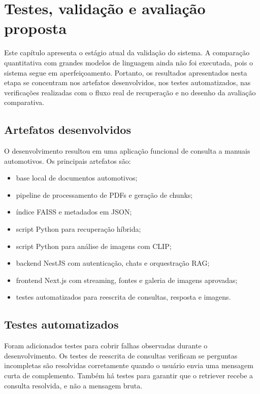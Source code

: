 \chapter{Testes, validação e avaliação proposta}
\label{cap:resultados}

Este capítulo apresenta o estágio atual da validação do sistema. A comparação quantitativa com grandes modelos de linguagem ainda não foi executada, pois o sistema segue em aperfeiçoamento. Portanto, os resultados apresentados nesta etapa se concentram nos artefatos desenvolvidos, nos testes automatizados, nas verificações realizadas com o fluxo real de recuperação e no desenho da avaliação comparativa.

\section{Artefatos desenvolvidos}

O desenvolvimento resultou em uma aplicação funcional de consulta a manuais automotivos. Os principais artefatos são:

\begin{itemize}
  \item base local de documentos automotivos;
  \item pipeline de processamento de PDFs e geração de chunks;
  \item índice FAISS e metadados em JSON;
  \item script Python para recuperação híbrida;
  \item script Python para análise de imagens com CLIP;
  \item backend NestJS com autenticação, chats e orquestração RAG;
  \item frontend Next.js com streaming, fontes e galeria de imagens aprovadas;
  \item testes automatizados para reescrita de consultas, resposta e imagens.
\end{itemize}

\section{Testes automatizados}

Foram adicionados testes para cobrir falhas observadas durante o desenvolvimento. Os testes de reescrita de consultas verificam se perguntas incompletas são resolvidas corretamente quando o usuário envia uma mensagem curta de complemento. Também há testes para garantir que o retriever recebe a consulta resolvida, e não a mensagem bruta.

